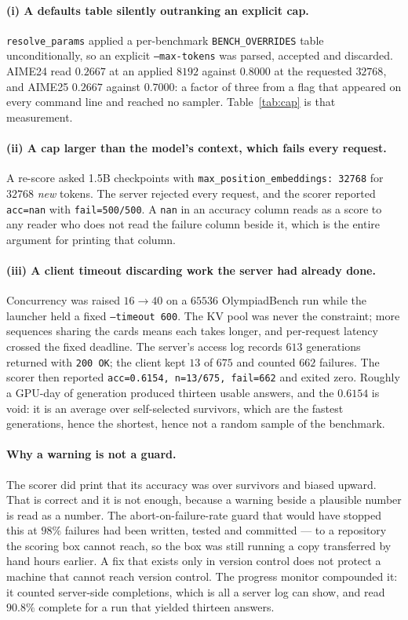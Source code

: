 \paragraph{(i) A defaults table silently outranking an explicit cap.} \texttt{resolve\_params}
applied a per-benchmark \texttt{BENCH\_OVERRIDES} table unconditionally, so an explicit
\texttt{--max-tokens} was parsed, accepted and discarded. AIME24 read $0.2667$ at an applied
$8192$ against $0.8000$ at the requested $32768$, and AIME25 $0.2667$ against $0.7000$: a
factor of three from a flag that appeared on every command line and reached no sampler.
Table~\ref{tab:cap} is that measurement.

\paragraph{(ii) A cap larger than the model's context, which fails every request.} A re-score
asked 1.5B checkpoints with \texttt{max\_position\_embeddings: 32768} for $32768$ \emph{new}
tokens. The server rejected every request, and the scorer reported
\texttt{acc=nan} with \texttt{fail=500/500}. A \texttt{nan} in an accuracy column reads as a
score to any reader who does not read the failure column beside it, which is the entire
argument for printing that column.

\paragraph{(iii) A client timeout discarding work the server had already done.} Concurrency
was raised $16 \to 40$ on a $65536$ OlympiadBench run while the launcher held a fixed
\texttt{--timeout 600}. The KV pool was never the constraint; more sequences sharing the cards
means each takes longer, and per-request latency crossed the fixed deadline. The server's
access log records $613$ generations returned with \texttt{200 OK}; the client kept $13$ of
$675$ and counted $662$ failures. The scorer then reported \texttt{acc=0.6154, n=13/675,
fail=662} and exited zero. Roughly a GPU-day of generation produced thirteen usable answers,
and the $0.6154$ is void: it is an average over self-selected survivors, which are the fastest
generations, hence the shortest, hence not a random sample of the benchmark.

\paragraph{Why a warning is not a guard.} The scorer did print that its accuracy was over
survivors and biased upward. That is correct and it is not enough, because a warning beside a
plausible number is read as a number. The abort-on-failure-rate guard that would have stopped
this at $98\%$ failures had been written, tested and committed --- to a repository the scoring
box cannot reach, so the box was still running a copy transferred by hand hours earlier. A fix
that exists only in version control does not protect a machine that cannot reach version
control. The progress monitor compounded it: it counted server-side completions, which is all
a server log can show, and read $90.8\%$ complete for a run that yielded thirteen answers.

